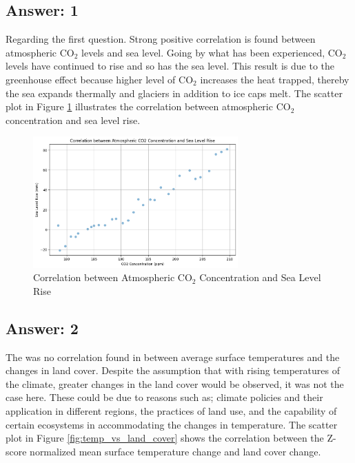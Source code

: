 \documentclass[a4paper,11pt]{article}
\begin{document}
\subsection{Answer: 1}

Regarding the first question. Strong positive correlation is found between atmospheric \(\text{CO}_2\) levels and sea level. Going by what has been experienced, \(\text{CO}_2\) levels have continued to rise and so has the sea level. This result is due to the greenhouse effect because higher level of \(\text{CO}_2\) increases the heat trapped, thereby the sea expands thermally and glaciers in addition to ice caps melt. The scatter plot in Figure \ref{fig:co2_vs_sea_level} illustrates the correlation between atmospheric \(\text{CO}_2\) concentration and sea level rise. 

\begin{figure}[ht!]
    \centering
    \includegraphics[width=0.7\textwidth]{pictures/q1.png}
    \caption{Correlation between Atmospheric \(\text{CO}_2\) Concentration and Sea Level Rise}
    \label{fig:co2_vs_sea_level}
\end{figure}


\subsection{Answer: 2}
The was no correlation found in between average surface temperatures and the changes in land cover. Despite the assumption that with rising temperatures of the climate, greater changes in the land cover would be observed, it was not the case here. These could be due to reasons such as; climate policies and their application in different regions, the practices of land use, and the capability of certain ecosystems in accommodating the changes in temperature. The scatter plot in Figure \ref{fig:temp_vs_land_cover} shows the correlation between the Z-score normalized mean surface temperature change and land cover change.
\end{document}
